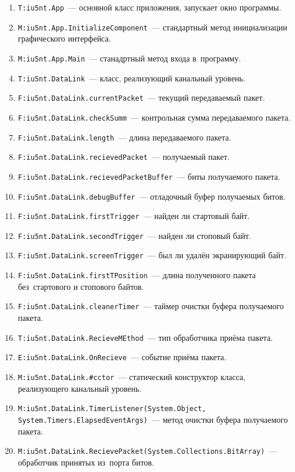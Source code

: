 \documentclass[a4paper,12pt]{article}
\begin{document}
\begin{enumerate}[noitemsep]
\item \texttt{T:iu5nt.App}~--- основной класс приложения, запускает окно программы.
\item \texttt{M:iu5nt.App.InitializeComponent}~--- стандартный метод инициализации графического интерфейса.
\item \texttt{M:iu5nt.App.Main}~--- станадртный метод входа в~программу.
\item \texttt{T:iu5nt.DataLink}~--- класс, реализующий канальный уровень.
\item \texttt{F:iu5nt.DataLink.currentPacket}~--- текущий передаваемый пакет.
\item \texttt{F:iu5nt.DataLink.checkSumm}~--- контрольная сумма передаваемого пакета.
\item \texttt{F:iu5nt.DataLink.length}~--- длина передаваемого пакета.
\item \texttt{F:iu5nt.DataLink.recievedPacket}~--- получаемый пакет.
\item \texttt{F:iu5nt.DataLink.recievedPacketBuffer}~--- биты получаемого пакета.
\item \texttt{F:iu5nt.DataLink.debugBuffer}~--- отладочный буфер получаемых битов.
\item \texttt{F:iu5nt.DataLink.firstTrigger}~--- найден ли стартовый байт.
\item \texttt{F:iu5nt.DataLink.secondTrigger}~--- найден ли стоповый байт.
\item \texttt{F:iu5nt.DataLink.screenTrigger}~--- был ли удалён экранирующий байт.
\item \texttt{F:iu5nt.DataLink.firstTPosition}~--- длина полученного пакета без~стартового и стопового байтов.
\item \texttt{F:iu5nt.DataLink.cleanerTimer}~--- таймер очистки буфера получаемого пакета.
\item \texttt{T:iu5nt.DataLink.RecieveMEthod}~--- тип обработчика приёма пакета.
\item \texttt{E:iu5nt.DataLink.OnRecieve}~--- событие приёма пакета.
\item \texttt{M:iu5nt.DataLink.\#cctor}~--- статический конструктор класса, реализующего канальный уровень.
\item \texttt{M:iu5nt.DataLink.TimerListener(System.Object,\\System.Timers.ElapsedEventArgs)}~--- метод очистки буфера получаемого пакета.
\item \texttt{M:iu5nt.DataLink.RecievePacket(System.Collections.BitArray)}~--- обработчик принятых из~порта битов.

\end{enumerate}
\end{document}
